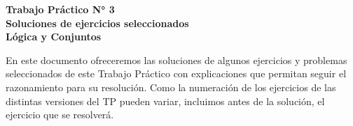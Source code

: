 \documentclass[12pt]{article}
\theoremstyle{definition}
\theoremstyle{remark}
\begin{document}
\fancyhf{}
\pagestyle{fancy}


\begin{centering}
\Large{\textbf{Trabajo Práctico N° 3}}\\
\large{\textbf{Soluciones de ejercicios seleccionados}}\\
\large{\textbf{Lógica y Conjuntos}}\\
\end{centering}
\vspace{1cm}
\noindent
En este documento ofreceremos las soluciones de algunos ejercicios y problemas seleccionados de este Trabajo Práctico con explicaciones que permitan seguir el razonamiento para su resolución. Como la numeración de los ejercicios de las distintas versiones del TP pueden variar, incluimos antes de la solución, el ejercicio que se resolverá.
\end{document}
